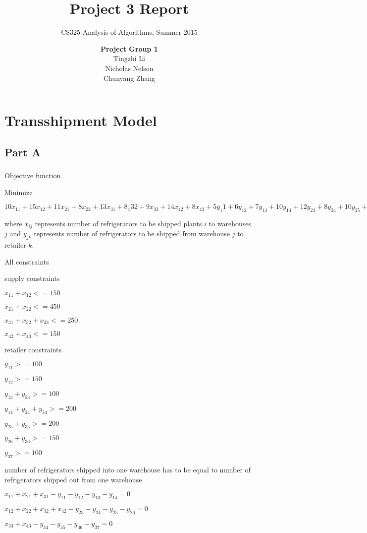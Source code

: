 \documentclass[11pt]{scrreprt}
\title{\textbf{Project 3 Report}}
\subtitle{CS325 Analysis of Algorithms, Summer 2015}
\author{\textsf{\textbf{Project Group 1}}\\
		\textsf{Tingzhi Li}\\
		\textsf{Nicholas Nelson}\\
		\textsf{Chunyang Zhang}}
\date{}
\begin{document}
\maketitle


\chapter{Transshipment Model}
\section{Part A}
\subsection{}
Objective function

Minimize

$10x_{11}+15x_{12}+11x_{21}+8x_{22}+13x_{31}+8_x{32}+9x_{33}+14x_{42}+8x_{43}+5y_{1}1+6y_{12}+7y_{13}+10y_{14}+12y_{23}+8y_{24}+10y_{25}+14y_{26}+12y_{35}+12y_{36}+6y_{37}$

where $x_{ij}$ represents number of refrigerators to be shipped plants $i$ to warehouses $j$ and $y_{jk}$ represents number of refrigerators to be shipped  from warehouse $j$ to retailer $k$.

All constraints

supply constraints

$x_{11} + x_{12} <= 150$

$x_{21} + x_{22} <= 450$

$x_{31} + x_{32} + x_{33} <= 250$

$x_{42} + x_{43} <= 150$

retailer constraints

$y_{11} >= 100$

$y_{12} >= 150$

$y_{13} + y_{23} >= 100$

$y_{14} + y_{24} + y_{34} >= 200$

$y_{25} + y_{35} >= 200$

$y_{26} + y_{36} >= 150$

$y_{37} >= 100$

number of refrigerators shipped into one warehouse has to be equal to number of refrigerators shipped out from one warehouse

$x_{11} + x_{21} + x_{31} - y_{11} - y_{12} - y_{13} - y_{14} = 0$

$x_{12} + x_{22} + x_{32} + x_{42} - y_{23} - y_{24} - y_{25} - y_{26} = 0$

$x_{33} + x_{43} - y_{34} - y_{35} - y_{36} - y_{37} = 0$
\end{document}

